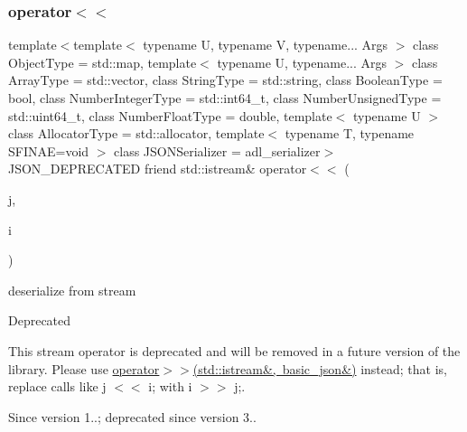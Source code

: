 \subsubsection{\texorpdfstring{operator$<$$<$}{operator<<}\hspace{0.1cm}{\footnotesize\ttfamily [2/2]}}
{\footnotesize\ttfamily template$<$template$<$ typename U, typename V, typename... Args $>$ class Object\+Type = std\+::map, template$<$ typename U, typename... Args $>$ class Array\+Type = std\+::vector, class String\+Type  = std\+::string, class Boolean\+Type  = bool, class Number\+Integer\+Type  = std\+::int64\+\_\+t, class Number\+Unsigned\+Type  = std\+::uint64\+\_\+t, class Number\+Float\+Type  = double, template$<$ typename U $>$ class Allocator\+Type = std\+::allocator, template$<$ typename T, typename S\+F\+I\+N\+A\+E=void $>$ class J\+S\+O\+N\+Serializer = adl\+\_\+serializer$>$ \\
J\+S\+O\+N\+\_\+\+D\+E\+P\+R\+E\+C\+A\+T\+ED friend std\+::istream\& operator$<$$<$ (\begin{DoxyParamCaption}\item[{\mbox{\hyperlink{classnlohmann_1_1basic__json}{basic\+\_\+json}}$<$ Object\+Type, Array\+Type, String\+Type, Boolean\+Type, Number\+Integer\+Type, Number\+Unsigned\+Type, Number\+Float\+Type, Allocator\+Type, J\+S\+O\+N\+Serializer $>$ \&}]{j,  }\item[{std\+::istream \&}]{i }\end{DoxyParamCaption})\hspace{0.3cm}{\ttfamily [friend]}}



deserialize from stream 

\begin{DoxyRefDesc}{Deprecated}
\item[\mbox{\hyperlink{deprecated__deprecated000002}{Deprecated}}]This stream operator is deprecated and will be removed in a future version of the library. Please use \mbox{\hyperlink{classnlohmann_1_1basic__json_aaf363408931d76472ded14017e59c9e8}{operator$>$$>$(std\+::istream\&, basic\+\_\+json\&)}} instead; that is, replace calls like {\ttfamily j $<$$<$ i;} with {\ttfamily i $>$$>$ j;}. \end{DoxyRefDesc}
\begin{DoxySince}{Since}
version 1..; deprecated since version 3.. 
\end{DoxySince}
\mbox{\label{classnlohmann_1_1basic__json_a5c8bb5200f5eac10d31e26be46e5b1ac}} 
